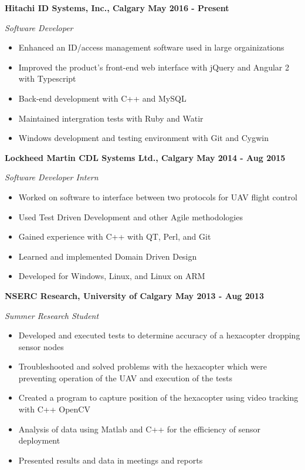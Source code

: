 \documentclass[12pt]{article}
\begin{document}
\bigskip
{}
\medskip

\noindent \centerline{ \bf Hitachi ID Systems, Inc., Calgary \hfill May 2016 - Present}
\indent \emph{ Software Developer }
\begin{itemize}
  \item Enhanced an ID/access management software used in large orgainizations
  \item Improved the product's front-end web interface with jQuery and Angular 2 with Typescript
  \item Back-end development with C++ and MySQL
  \item Maintained intergration tests with Ruby and Watir
  \item Windows development and testing environment with Git and Cygwin
\end{itemize}

\noindent \centerline{ \bf Lockheed Martin CDL Systems Ltd., Calgary \hfill May 2014 - Aug 2015}
\indent \emph{ Software Developer Intern }
\begin{itemize}
  \item Worked on software to interface between two protocols for UAV flight control
  \item Used Test Driven Development and other Agile methodologies
  \item Gained experience with C++ with QT, Perl, and Git
  \item Learned and implemented Domain Driven Design
  \item Developed for Windows, Linux, and Linux on ARM
\end{itemize}

\noindent \centerline{ \bf NSERC Research, University of Calgary \hfill May 2013 - Aug 2013}
\indent \emph{ Summer Research Student }
\begin{itemize}
  \item Developed and executed tests to determine accuracy of a hexacopter dropping sensor nodes
  \item Troubleshooted and solved problems with the hexacopter which were preventing operation of the UAV and execution of the tests
  \item Created a program to capture position of the hexacopter using video tracking with C++ OpenCV
  \item Analysis of data using Matlab and C++ for the efficiency of sensor deployment
  \item Presented results and data in meetings and reports
\end{itemize}
\end{document}

